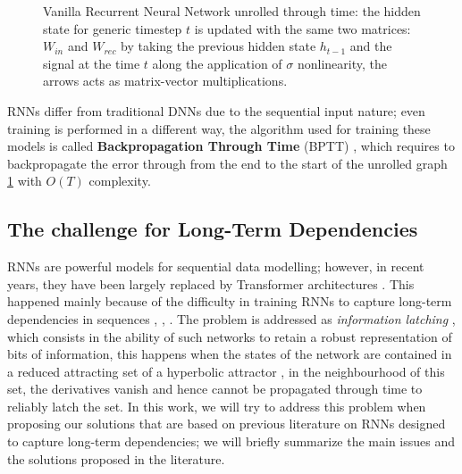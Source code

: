\begin{figure}[H]
    \caption{Vanilla Recurrent Neural Network unrolled through time: the hidden state for generic timestep $t$ is updated with the same two matrices: $W_{in}$ and $W_{rec}$ by taking the previous hidden state $h_{t-1}$ and the signal at the time $t$ along the application of $\sigma$ nonlinearity, the arrows acts as matrix-vector multiplications.}
    \label{fig:rnn_unrolled}
\end{figure}

RNNs differ from traditional DNNs due to the sequential input nature; even training is performed in a different way,
the algorithm used for training these models is called \textbf{Backpropagation Through Time} (BPTT) \cite{werbos2002backpropagation}, which requires 
to backpropagate the error through from the end to the start of the unrolled graph \ref{fig:rnn_unrolled} with $O(T)$ complexity.
\newline
\subsection{The challenge for Long-Term Dependencies}
\label{sec:rnn_long_term_dependencies}
RNNs are powerful models for sequential data modelling; however, in recent years, they have been largely replaced by Transformer architectures \cite{vaswani2023attentionneed}.
This happened mainly because of the difficulty in training RNNs to capture long-term dependencies in sequences \cite{article}, \cite{230622}, \cite{279181}. The problem is addressed as \textit{information latching} \cite{298725}, which
consists in the ability of such networks to retain a robust representation of bits of information, this happens when the states of the network are contained in a reduced attracting set of a hyperbolic attractor \cite{haykin2009neural}, in the neighbourhood of this set, the derivatives vanish and hence cannot be propagated through time to reliably latch the set.
In this work, we will try to address this problem when proposing our solutions that are based on
previous literature on RNNs designed to capture long-term dependencies; we will briefly summarize the main issues and the solutions proposed in the literature.
